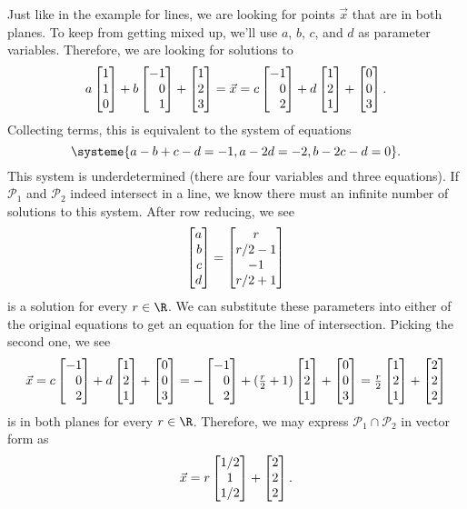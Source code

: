 \begin{example}
	Just like in the example for lines, we are looking for points $\vec x$ that are in both planes. To
	keep from getting mixed up, we'll use $a$, $b$, $c$, and $d$ as parameter variables. Therefore, we are looking
	for solutions to
	\[
		a\mat{1\\1\\0}+b\mat{-1\\0\\1}+\mat{1\\2\\3}=\vec x=c\mat{-1\\0\\2}+d\mat{1\\2\\1}+\mat{0\\0\\3}.
	\]
	Collecting terms, this is equivalent to the system of equations
	\[
		\systeme{a-b+c-d=-1,a-2d=-2,b-2c-d=0}.
	\]
	This system is underdetermined (there are four variables and three equations). If $\mathcal P_1$ 
	and $\mathcal P_2$ indeed intersect in a line, we know there must an infinite number
	of solutions to this system. After row reducing, we see
	\[
		\mat{a\\b\\c\\d} = \matc{r\\r/2-1\\-1\\r/2+1}
	\]
	is a solution for every $r\in\R$. We can substitute these parameters into either of the original equations
	to get an equation for the line of intersection. Picking the second one, we see
	\[
		\vec x=c\mat{-1\\0\\2}+d\mat{1\\2\\1}+\mat{0\\0\\3}=-\mat{-1\\0\\2}+(\tfrac{r}{2}+1)\mat{1\\2\\1}+\mat{0\\0\\3}
		=\tfrac{r}{2}\mat{1\\2\\1}+\mat{2\\2\\2}
	\]
	is in both planes for every $r\in \R$. Therefore, we may express $\mathcal P_1\cap \mathcal P_2$ in vector form as
	\[
		\vec x=r\matc{1/2\\1\\1/2}+\mat{2\\2\\2}.
	\]
\end{example}

